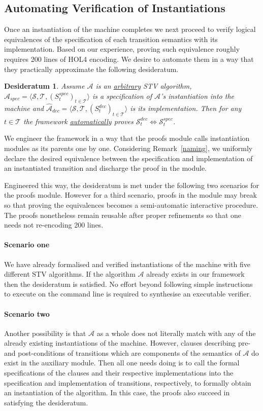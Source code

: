 \documentclass[10pt,conference]{IEEEtran}
\newtheorem{conjecture}{Desideratum}
\begin{document}
\subsection{Automating Verification of Instantiations}  
Once an instantiation of the machine  completes   
 we next proceed to verify logical equivalences of the specification of each transition semantics with its  implementation. 
Based on our experience, proving  such equivalence  
roughly requires 200 lines of HOL4 encoding. 
We desire to automate them in a way that they practically approximate the following desideratum.    
 \begin{conjecture}\label{conj}
 Assume $\mathcal{A}$ is an \underline{arbitrary} STV algorithm, $\hat{\mathcal{A}}_{spec}= \langle \mathcal{S}, \mathcal{T}, (S_{t}^{spec})_{t \in \mathcal{T}} \rangle$ is a specification of $\mathcal{A}$'s instantiation into the machine and $\hat{\mathcal{A}}_{dec}= \langle \mathcal{S}, \mathcal{T}, (S_{t}^{dec})_{t \in \mathcal{T}} \rangle$ is its implementation. 
  Then for any $t\in\mathcal{T}$ the framework \underline{automatically} proves  $\mathcal{S}_{t}^{dec}\Leftrightarrow\mathcal{S}_{t}^{spec}$. 
 \end{conjecture}
We engineer the framework in a way that the proofs module calls instantiation modules as its parents  one by one.
 Considering Remark~\ref{naming},   we uniformly declare the desired equivalence between the specification and implementation of an instantiated transition and discharge the proof in the  module.


Engineered this way, the desideratum is met under the following two scenarios for the proofs module. However for a third scenario, proofs in the module may break so that proving the equivalences  becomes a semi-automatic interactive procedure. The proofs nonetheless remain reusable after proper refinements so that one needs not re-encoding 200 lines.  
 \paragraph*{Scenario one} We have already formalised and verified instantiations of the machine with five different STV algorithms. If the algorithm $\mathcal{A}$ already exists in our framework then the desideratum is satisfied. No effort beyond following simple instructions to execute on the command line is required to synthesise an executable verifier.  
 \paragraph*{Scenario two} Another possibility is that 
 $\mathcal{A}$ as a whole does not literally match with any of the already existing instantiations of the machine. However, clauses describing pre- and post-conditions of transitions which are components of the semantics of $\mathcal{A}$ do exist in the auxiliary module. Then all one needs doing is to call the formal  specifications of the clauses and their respective implementations into the specification and implementation of transitions, respectively,  to formally obtain an instantiation of the algorithm. In this case, the proofs also succeed in satisfying the desideratum. 
\end{document}
